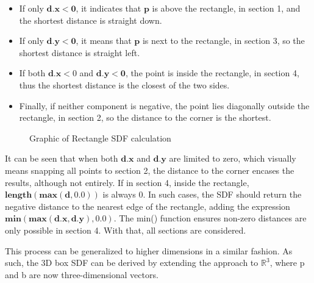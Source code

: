 \begin{itemize}
    \item If only $\mathbf{d.x<0}$, it indicates that $\mathbf{p}$ is above the rectangle, in section 1, and the shortest distance is straight down.
    \item If only $\mathbf{d.y<0}$, it means that $\mathbf{p}$ is next to the rectangle, in section 3, so the shortest distance is straight left.
    \item If both $\mathbf{d.x}<0$ and $\mathbf{d.y<0}$, the point is inside the rectangle, in section 4, thus the shortest distance is the closest of the two sides.
    \item Finally, if neither component is negative, the point lies diagonally outside the rectangle, in section 2, so the distance to the corner is the shortest.
\end{itemize}

\begin{figure}[ht]
    \centering
    \caption{Graphic of Rectangle SDF calculation}
    \label{fig:square_sdf}
\end{figure}

It can be seen that when both $\mathbf{d.x}$ and $\mathbf{d.y}$ are limited to zero, which visually means snapping all points to section 2, the distance to the corner encases the results, although not entirely. If in section 4, inside the rectangle, $\mathbf{length(max(d,0.0))}$ is always 0. In such cases, the SDF should return the negative distance to the nearest edge of the rectangle, adding the expression $\mathbf{min(max(d.x,d.y),0.0)}$. The min() function ensures non-zero distances are only possible in section 4. With that, all sections are considered.

This process can be generalized to higher dimensions in a similar fashion. As such, the 3D box SDF can be derived by extending the approach to $\mathbb{R}^3 $, where p and b are now three-dimensional vectors.


